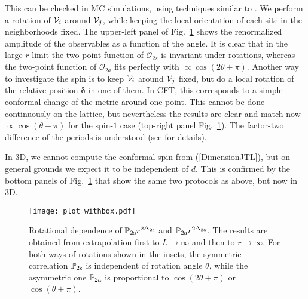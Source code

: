 \documentclass[aps,prl,twocolumn,showpacs,superscriptaddress,groupedaddress]{revtex4}  %
\def\bbp{{\mathbb P}}
\begin{document}
This can be checked in MC simulations, using techniques similar to \cite{CJV}.
We perform a rotation of ${\cal V}_i$ around ${\cal V}_j$, while keeping the local orientation of each site in the neighborhoods fixed.
The upper-left panel of Fig.~\ref{fig03} shows the renormalized amplitude of the observables as a function of the angle.
It is clear that in the large-$r$ limit the two-point function of $\mathcal{O}_{2s}$ is invariant under rotations, whereas the
two-point function of $\mathcal{O}_{2a}$ fits perfectly with $\propto \cos(2\theta +\pi)$.
Another way to investigate the spin is to keep ${\cal V}_i$ around ${\cal V}_j$ fixed, but do a local
rotation of the relative position $\boldsymbol\delta$ in one of them. In CFT, this corresponds to a
simple conformal change of the metric around one point. This cannot be done continuously on the lattice,
but nevertheless the results are clear and match now $\propto \cos(\theta+\pi)$ for the spin-$1$ case (top-right panel Fig.~\ref{fig03}).
The factor-two difference of the periods is understood (see \cite{CJV} for details).

In 3D, we cannot compute the conformal spin from (\ref{DimensionJTL}), but on general grounds we expect it to be independent of $d$.
This is confirmed by the bottom panels of Fig.~\ref{fig03} that show the same two protocols as above, but now in 3D.

\begin{figure}
\texttt{[image: plot\_withbox.pdf]}
\caption{Rotational dependence of $\bbp_{\rm 2s} r^{2\Delta_{\rm 2s}}$ and $\bbp_{\rm 2a} r^{2\Delta_{\rm 2a}}$. 
The results are obtained from extrapolation first to $L \rightarrow \infty$ and then to $r \rightarrow \infty$.
For both ways of rotations shown in the insets, the symmetric correlation $ \bbp_{\rm 2s} $ is independent of rotation angle $\theta$, 
    while the asymmetric one $\bbp_{\rm 2a}$ is proportional to $\cos (2\theta+\pi)$ or $\cos(\theta+\pi)$.
}
\label{fig03}
\end{figure}
\end{document}
